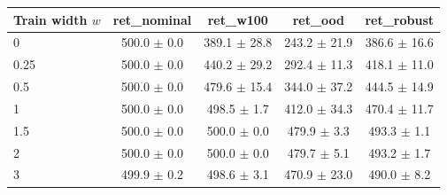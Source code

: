 \begin{tabular}{lcccc}
\toprule
Train width $w$ & ret\_nominal & ret\_w100 & ret\_ood & ret\_robust \\
\midrule
0 & 500.0 $\pm$ 0.0 & 389.1 $\pm$ 28.8 & 243.2 $\pm$ 21.9 & 386.6 $\pm$ 16.6 \\
0.25 & 500.0 $\pm$ 0.0 & 440.2 $\pm$ 29.2 & 292.4 $\pm$ 11.3 & 418.1 $\pm$ 11.0 \\
0.5 & 500.0 $\pm$ 0.0 & 479.6 $\pm$ 15.4 & 344.0 $\pm$ 37.2 & 444.5 $\pm$ 14.9 \\
1 & 500.0 $\pm$ 0.0 & 498.5 $\pm$ 1.7 & 412.0 $\pm$ 34.3 & 470.4 $\pm$ 11.7 \\
1.5 & 500.0 $\pm$ 0.0 & 500.0 $\pm$ 0.0 & 479.9 $\pm$ 3.3 & 493.3 $\pm$ 1.1 \\
2 & 500.0 $\pm$ 0.0 & 500.0 $\pm$ 0.0 & 479.7 $\pm$ 5.1 & 493.2 $\pm$ 1.7 \\
3 & 499.9 $\pm$ 0.2 & 498.6 $\pm$ 3.1 & 470.9 $\pm$ 23.0 & 490.0 $\pm$ 8.2 \\
\bottomrule
\end{tabular}
